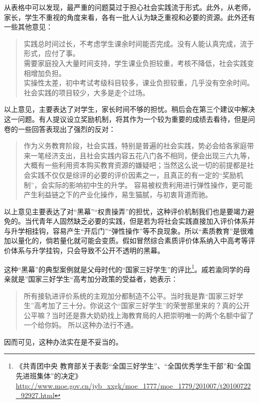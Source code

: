 \documentclass[12pt,UTF8]{ctexart}
\begin{document}
\par {
	从表格中可以发现，最严重的问题莫过于担心社会实践流于形式。此外，从老师，家长，学生不重视的角度来看，各有一批人认为缺乏重视和必要的资源。此外还有一些其他意见：
	\begin{quote}
		\kaishu 实践总时间过长，不考虑学生课余时间能否完成。没有人能认真完成，流于形式，应付了事。\\
		需要家庭投入大量时间支持，学生课业负担较重，考核不降低，社会实践变相增加负担。\\
		实操性太差，初中考试考级科目较多，课业负担较重，几乎没有空余时间。社会实践的项目较少，大多是走个过场。\\
	\end{quote}
	
	以上意见，主要表达了对学生，家长时间不够的担忧。稍后会在第三个建议中解决这一问题。有人提议设立奖励机制，将其作为一个较为重要的成绩去看待，但是问卷的一些回答表现出了强烈的反对：
	\begin{quote}
		\kaishu
		作为义务教育阶段，社会实践，特别是普遍的社会实践，势必会给各家庭带来一笔经济支出，且社会实践内容五花八门各不相同，便会出现三六九等，大概有一些利用资本购买教育资源的嫌疑吧；当然这么说一切的前提都是社会实践不仅仅是综评的必要的评价因素之一，且真正的有一定的“奖励机制”，会实际的影响初中生的升学。
		\kaishu 容易被权贵利用进行弹性操作，更可能产生利益链之下的产业化操作，易生猫腻，与初衷背道而驰。
	\end{quote}
	
	以上意见主要表达了对“黑幕”“权贵操弄”的担忧，这种评价机制我们也是要竭力避免的。当代青年人固然缺乏必要的实践，但是若为将社会实践直接加入评价体系并与升学相挂钩，容易产生“开后门”“弹性操作”等不良现象。所以“素质教育”是很难加以量化的，倘若量化就可能会变质。假如冒然综合素质评价体系纳入中高考等评价体系与升学挂钩，只会导致不公开不透明的黑幕。
}
\par {
	这种“黑幕”的典型案例就是父母时代的“国家三好学生”的评比\footnote{《共青团中央
		教育部关于表彰“全国三好学生”、“全国优秀学生干部”和“全国先进班集体”的决定》\url{http://www.moe.gov.cn/jyb_xxgk/moe_1777/moe_1779/201007/t20100722_92927.html}}。戚若渝同学的母亲就是”国家三好学生“高考加分政策的受益者，她表示：
	\begin{quote}
		\kaishu
		所有接轨进评价系统的主观加分都制造不公平。当时我是靠“国家三好学生”高考加了三十分。你说这个“国家三好学生”的荣誉那里来的？真的公开公平嘛？当时还是靠大奶奶找上海教育局的人把崇明唯一的两个名额中留了一个给你妈。
		所以这种办法行不通。
	\end{quote}
	因而可见，这种办法实在是不妥当的。
}
\end{document}
